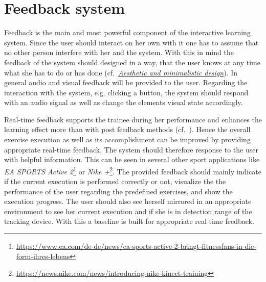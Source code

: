 \section{Feedback system}\label{4_5_feedbackSystem}



Feedback is the main and most powerful component of the interactive learning system. Since the user should interact on her own with it one has to assume that no other person interfere with her and the system. With this in mind the feedback of the system should designed in a way, that the user knows at any time what she has to do or has done (cf.~\textit{\hyperref[nielsenDesignPrinciples]{Aesthetic and minimalistic design}}). In general audio and visual feedback will be provided to the user. Regarding the interaction with the system, e.g. clicking a button, the system should respond with an audio signal as well as change the elements visual state accordingly.

Real-time feedback supports the trainee during her performance and enhances the learning effect more than with post feedback methods (cf.~\textit{}). Hence the overall exercise execution as well as its accomplishment can be improved by providing appropriate real-time feedback. The system should therefore response to the user with helpful information. This can be seen in several other sport applications like \textit{EA SPORTS Active 2}\footnote{\url{https://www.ea.com/de-de/news/ea-sports-active-2-bringt-fitnessfans-in-die-form-ihres-lebens}} or \textit{Nike +}\footnote{\url{https://news.nike.com/news/introducing-nike-kinect-training}}. The provided feedback should mainly indicate if the current execution is performed correctly or not, visualize the the performance of the user regarding the predefined exercises, and show the execution progress. The user should also see herself mirrored in an appropriate environment to see her current execution and if she is in detection range of the tracking device. With this a baseline is built for appropriate real time feedback.

